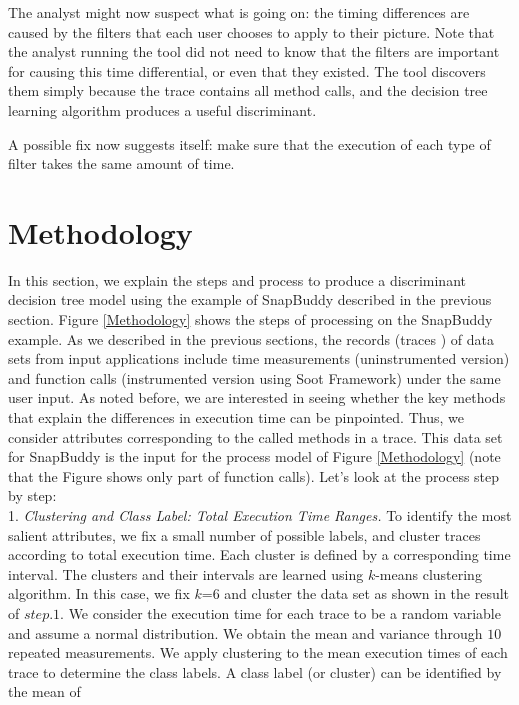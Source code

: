 \documentclass{article}
\begin{document}
The analyst might now suspect what is going on: the timing
differences are caused by the filters that each user chooses to apply
to their picture. %
Note that the analyst running the tool did not need to
know that the filters are important for causing this time differential, or even that
they existed. The tool discovers them simply because the trace
contains all method calls, and the decision tree learning algorithm
produces a useful discriminant.

A possible fix now suggests itself: make sure that the execution of
each type of filter takes the same amount of time.

\section{Methodology}
In this section, we explain the steps and process to produce a discriminant
decision tree model using the example of SnapBuddy described in the previous
section. Figure \ref{Methodology} shows the steps of processing on the SnapBuddy
example. As we described in the previous sections, the records (traces ) of data sets from
input applications include time measurements (uninstrumented version) and function
calls (instrumented version using Soot Framework) under the same user input. As noted before,
we are interested in seeing whether the key
methods that explain the differences in execution time can be pinpointed. Thus, we
consider attributes corresponding to the called methods in a trace. This data set for SnapBuddy
is the input for the process model of Figure \ref{Methodology} (note that the Figure shows
only part of function calls). 
Let's look at the process step by step: \\
1. \smallskip\textit{Clustering and Class Label: Total Execution Time Ranges.}
To identify the most salient attributes, we fix a small number of possible
labels, and cluster traces according to total execution time. 
Each cluster is defined by a corresponding time interval. The clusters and
their intervals are learned using $k$-means clustering
algorithm. In this case, we fix $k$=6 and cluster the data set as shown in the
result of $step.1$. We consider the execution time for each trace to be a
random variable and assume a normal distribution.
We obtain the mean and variance through $10$ repeated measurements.
We apply clustering to the mean execution times of each trace to
determine the class labels. A class label (or cluster) can be identified by the mean of
\end{document}

